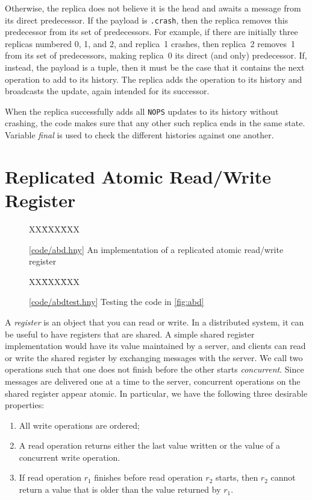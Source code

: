 \documentclass{report}
\newcommand{\harmonysource}[1]{
\begin{tabbing}
XX\=XXX\=XXX\kill
    
\end{tabbing}
}
\newcommand{\harmonylink}[1]{%
[\href{https://harmony.cs.cornell.edu/#1}{\underline{#1}}]%
}
\newenvironment{code}{
\tcolorbox
}{
\endtcolorbox
}
\begin{document}
Otherwise, the replica does not believe it is the head and
awaits a message from its direct predecessor.
If the payload is \texttt{.crash}, then the replica removes this
predecessor from its set of predecessors.  For example, if there
are initially three replicas numbered 0, 1, and 2, and replica~1
crashes, then replica~2 removes~1 from its set of predecessors, making
replica~0 its direct (and only) predecessor.  If, instead, the payload
is a tuple, then it must be the case that it contains the next operation
to add to its history.  The replica adds the operation to its history
and broadcasts the update, again intended for its successor.

When the replica successfully adds all \texttt{NOPS} updates to its
history without crashing, the code makes sure that any other such replica
ends in the same state.  Variable \textit{final} is used to check the
different histories against one another.

\chapter{Replicated Atomic Read/Write Register}
\label{ch:abd}

\begin{figure}
\begin{code}
\harmonysource{abd}
\end{code}
\caption{\harmonylink{code/abd.hny} An implementation of a replicated atomic read/write register}
\label{fig:abd}
\end{figure}

\begin{figure}
\begin{code}
\harmonysource{abdtest}
\end{code}
\caption{\harmonylink{code/abdtest.hny} Testing the code in \autoref{fig:abd}}
\label{fig:abdtest}
\end{figure}

A \emph{register} is an object that you can read or write.  In a distributed
system, it can be useful to have registers that are shared.
A simple shared register implementation
would have its value maintained by a server, and clients can read or write the
shared register by exchanging messages with the server.
We call two operations such that one does not finish before the other starts
\emph{concurrent}.
Since messages are delivered one at a time to the server,
concurrent operations on the shared register appear atomic.
In particular, we have the following three desirable properties:
\begin{enumerate}
\item All write operations are ordered;
\item A read operation returns either the last value written or the value of
a concurrent write operation.
\item If read operation $r_1$ finishes before read operation $r_2$ starts,
then $r_2$ cannot return a value that is older than the value returned
by $r_1$.
\end{enumerate}
\end{document}
